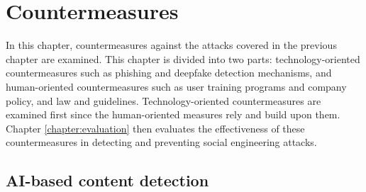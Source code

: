 


\chapter{Countermeasures\label{chapter:countermeasures}}

\begin{comment}

Guides:
    - 

TODO:
    [ ] 

What to cover:
    - AI monitoring content and informing the user if something they are about to share could be used against them or their organization?
    - AI generated training content suited to the personality of the user
    - Policies and EU etc regulations about the development of AI tech

\end{comment}

In this chapter, countermeasures against the attacks covered in the previous chapter are examined. This chapter is divided into two parts: technology-oriented countermeasures such as phishing and deepfake detection mechanisms, and human-oriented countermeasures such as user training programs and company policy, and law and guidelines. Technology-oriented countermeasures are examined first since the human-oriented measures rely and build upon them. Chapter \ref{chapter:evaluation} then evaluates the effectiveness of these countermeasures in detecting and preventing social engineering attacks.















\section{AI-based content detection}

\begin{comment}

AI-generated content detection

What to cover:
    - Deepfake content detection
    - Spear phishing detection
        - Also spear phishing that is written by humans (thus the title can't be AI-generated content detection?)

    
\end{comment}


